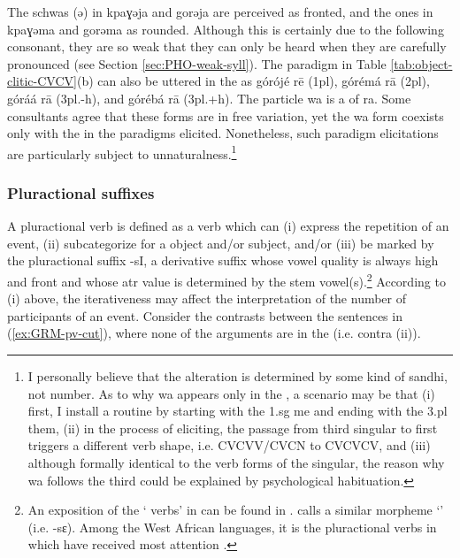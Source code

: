 \begin{exe}
\begin{exe}
\begin{exe}
\begin{exe}
\begin{exe}
\begin{exe}
\begin{exe}
\begin{exe}
\begin{exe}
\begin{exe}
\begin{exe}
\begin{exe}
The schwas ({\sls ə}) in {\sls kpaɣəja} and  {\sls gorəja} are perceived as 
fronted,
and the ones in {\sls kpaɣəma} and {\sls gorəma}  as rounded. Although this is
certainly due to the following consonant, they are so weak that they can only be
heard when they are carefully pronounced (see Section \ref{sec:PHO-weak-syll}). 
The paradigm in Table  
\ref{tab:object-clitic-CVCV}(b) can also be uttered in the  as 
{\sls górójé rē} ({\sc 1pl}),  %
{\sls górémá rā} ({\sc 2pl}), %
{\sls góráá rā} ({\sc 3pl.-h}), and %
{\sls górébá rā} ({\sc 3pl.+h}). 
 The  particle {\sls wa} is a
 of {\sls ra}. Some consultants  agree that these forms are in free 
variation,
yet the {\sls wa} form coexists only with  the  in the paradigms elicited.
Nonetheless, such paradigm elicitations are particularly subject to
unnaturalness.\footnote{I personally believe that the alteration is
determined by some kind of sandhi, not number. As to why {\sls wa} appears only 
in
the , a scenario may be that (i) first, I install a routine by starting
with the 1.{\sc sg} {\sc me} and ending with the 3.{\sc pl} {\sc them}, (ii) in the process of eliciting, the passage
from third singular to first  triggers  a different verb shape, i.e.
CVCVV/CVCN  to CVCVCV, and (iii)  although formally identical to the verb forms
of the singular, the reason why {\sls wa} follows the third   
could
be explained by psychological habituation.}

\subsubsection{Pluractional suffixes}
\label{sec:GRM-PluralVerb}


A pluractional verb is defined as a verb which can (i) express the repetition of an event,  (ii)   subcategorize for a  object and/or   subject, and/or  (iii)  be marked by the pluractional suffix {\sls -sI}, a derivative suffix whose  vowel quality is always high and front and whose {\sc atr} value is determined by the stem vowel(s).\footnote{An exposition of the ` verbs' in  can be found in \citet{Blen03}. \citet[viii]{daku07} calls a similar morpheme `' (i.e.  {\sls -sɛ}).  Among the West African languages, it is the pluractional verbs in  which have received most attention \citep[see][]{Jose08}.}  According to (i) above, the iterativeness may affect the interpretation of the number of participants of an event. Consider the contrasts between the sentences in (\ref{ex:GRM-pv-cut}), where none of the arguments are in the  (i.e. contra (ii)).


\end{exe}
\end{exe}
\end{exe}
\end{exe}
\end{exe}
\end{exe}
\end{exe}
\end{exe}
\end{exe}
\end{exe}
\end{exe}
\end{exe}
